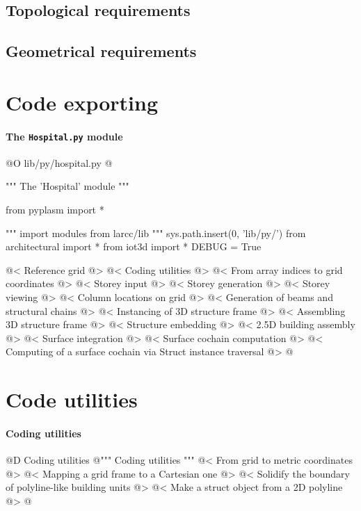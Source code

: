 \documentclass[11pt,oneside]{article}    %
\begin{document}
\subsection{Topological requirements}

\subsection{Geometrical requirements}


\section{Code exporting}

\paragraph{The \texttt{Hospital.py} module}
@O lib/py/hospital.py
@{""" The 'Hospital' module """

from pyplasm import *

""" import modules from larcc/lib """
sys.path.insert(0, 'lib/py/')
from architectural import *
from iot3d import *
DEBUG = True

@< Reference grid @>
@< Coding utilities @>
@< From array indices to grid coordinates @>
@< Storey input @>
@< Storey generation @>
@< Storey viewing @>
@< Column locations on grid @>
@< Generation of beams and structural chains @>
@< Instancing of 3D structure frame @>
@< Assembling 3D structure frame @>
@< Structure embedding @>
@< 2.5D building assembly @>
@< Surface integration @>
@< Surface cochain computation @>
@< Computing of a surface cochain via Struct instance traversal @>
@}


\appendix
\section{Code utilities}

\paragraph{Coding utilities}
@D Coding utilities
@{""" Coding utilities """
@< From grid to metric coordinates @>
@< Mapping a grid frame to a Cartesian one @>
@< Solidify the boundary of polyline-like building units @>
@< Make a struct object from a 2D polyline @>
@}
\end{document}
